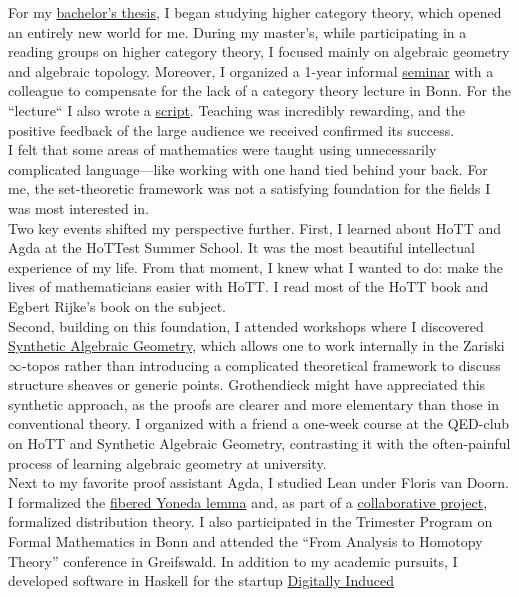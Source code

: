\documentclass[12pt,headings=small,paper=A4,DIV=calc]{article}
\begin{document}
For my \href{https://uni-bonn.sciebo.de/s/PJUqHE52SnCKJMy}{bachelor's thesis}, I began studying higher category theory, which opened an entirely new world for me. During my master's, while participating in a reading groups on higher category theory, I focused mainly on algebraic geometry and algebraic topology. Moreover, I organized a 1-year informal \href{https://uni-bonn.sciebo.de/s/eEHziabNePFwvb4}{seminar} with a colleague to compensate for the lack of a category theory lecture in Bonn. For the ``lecture`` I also wrote a \href{https://uni-bonn.sciebo.de/s/RzjF14df9WvD3O5}{script}. Teaching was incredibly rewarding, and the positive feedback of the large audience we received confirmed its success. \\
I felt that some areas of mathematics were taught using unnecessarily complicated language---like working with one hand tied behind your back. For me, the set-theoretic framework was not a satisfying foundation for the fields I was most interested in. \\
Two key events shifted my perspective further. First, I learned about HoTT and Agda at the HoTTest Summer School. It was the most beautiful intellectual experience of my life. From that moment, I knew what I wanted to do: make the lives of mathematicians easier with HoTT. I read most of the HoTT book and Egbert Rijke's book on the subject. \\
Second, building on this foundation, I attended workshops where I discovered \href{https://github.com/felixwellen/synthetic-zariski}{Synthetic Algebraic Geometry}, which allows one to work internally in the Zariski $\infty$-topos rather than introducing a complicated theoretical framework to discuss structure sheaves or generic points. Grothendieck might have appreciated this synthetic approach, as the proofs are clearer and more elementary than those in conventional theory. I organized with a friend a one-week course at the QED-club on HoTT and Synthetic Algebraic Geometry, contrasting it with the often-painful process of learning algebraic geometry at university. \\
Next to my favorite proof assistant Agda, I studied Lean under Floris van Doorn. I formalized the \href{https://github.com/timlichtnau/LeanCourse23/tree/master/LeanCourse/Project}{fibered Yoneda lemma} and, as part of a \href{https://github.com/timlichtnau/BonnAnalysis/tree/master/BonnAnalysis}{collaborative project}, formalized distribution theory. I also participated in the Trimester Program on Formal Mathematics in Bonn and attended the ``From Analysis to Homotopy Theory'' conference in Greifswald. In addition to my academic pursuits, I developed software in Haskell for the startup \href{https://www.digitallyinduced.com/}{Digitally Induced} \\
\end{document}

